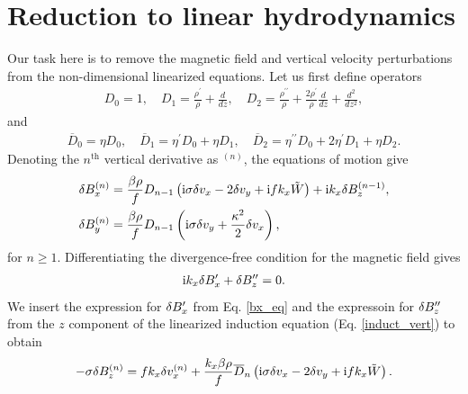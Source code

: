 \section{Reduction to linear hydrodynamics}\label{reduction} 
Our task here is to remove the magnetic field and vertical velocity
perturbations from the non-dimensional linearized equations. 
Let us first define operators
\begin{align}
  D_0 = 1, \quad D_1 = \frac{\rho^\prime}{\rho} + \frac{d}{dz}, \quad
  D_2 = \frac{\rho^{\prime\prime}}{\rho} +
  \frac{2\rho^\prime}{\rho}\frac{d}{dz} + \frac{d^2}{d z^2},
\end{align}
and 
\begin{align}
  \overline{D}_0 = \eta D_0, \quad \overline{D}_1 = \eta^\prime D_0 + \eta
  D_1,\quad \overline{D}_2 = \eta^{\prime\prime} D_0 + 2\eta^\prime D_1 +
  \eta D_2. 
\end{align}
Denoting the $n^\mathrm{th}$ vertical derivative as $^{(n)}$, the
equations of motion give
\begin{align}
  &\delta B_x^{(n)} = \frac{\beta\rho}{f}D_{n-1}\left(\mathrm{i}\sigma\delta v_x - 2\delta v_y +
  \mathrm{i} f k_x\tilde{W}\right) + \mathrm{i} k_x \delta B_z^{(n-1)},\label{bx_eq}\\
  &\delta B_y^{(n)} = \frac{\beta\rho}{f}D_{n-1}\left(\mathrm{i}\sigma\delta v_y +
  \frac{\kappa^2}{2}\delta v_x\right),\label{by_eq}
\end{align}
for $n\geq1$. Differentiating the divergence-free condition for the magnetic
field gives
\begin{align}
  \mathrm{i} k_x \delta B_x^{\prime} + \delta B_z^{\prime\prime} = 0.   
\end{align}
We insert the expression for $\delta B_x^\prime$ from Eq. \ref{bx_eq} and the
expressoin for $\delta B_z^{\prime\prime}$ from the $z$ component of the
linearized induction equation (Eq. \ref{induct_vert}) to obtain
\begin{align}\label{bz_eq}
  -\sigma\delta B_z^{(n)} = f k_x \delta v_x^{(n)} + \frac{k_x\beta\rho}{f}\overline{D}_n\left(\mathrm{i}\sigma\delta v_x - 2\delta v_y +
  \mathrm{i} f k_x\tilde{W} \right). 
\end{align}

